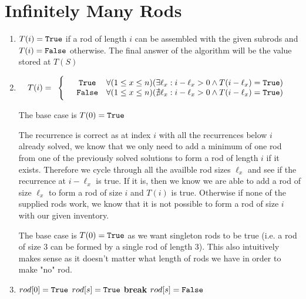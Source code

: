 \documentclass{article}
\begin{document}
\section{Infinitely Many Rods}
\begin{enumerate}
    \item $T(i) = \texttt{True}$ if a rod of length $i$ can be assembled with the given subrods and $T(i) = \texttt{False}$ otherwise.
            The final answer of the algorithm will be the value stored at $T(S)$
    \item         
        \begin{align*}
            T(i) = 
            \begin{array}{cc}
                \Bigg\{ & 
                \begin{array}{cc}
                    \texttt{True} & \forall (1 \leq x \leq n)(\exists \ell_x: i-\ell_x > 0 \land T(i-\ell_x) = \texttt{True})   \\
                    \texttt{False} & \forall (1 \leq x \leq n)(\nexists \ell_x: i-\ell_x > 0 \land T(i-\ell_x) = \texttt{True})
                \end{array}
            \end{array}
        \end{align*}

        The base case is $T(0) = \texttt{True}$

        The recurrence is correct as at index $i$ with all the recurrences below $i$ already solved, we know that we only need to add a minimum of one rod from one of the previously solved solutions to form a rod of length $i$ if it exists.
        Therefore we cycle through all the availble rod sizes $\ell_x$ and see if the recurrence at $i - \ell_x$ is true. If it is, then we know we are able to add a rod of size $\ell_x$ to form a rod of size $i$ and $T(i)$ is true.
        Otherwise if none of the supplied rods work, we know that it is not possible to form a rod of size $i$ with our given inventory. 

        The base case is $T(0) = \texttt{True}$ as we want singleton rods to be true (i.e. a rod of size 3 can be formed by a single rod of length 3). 
        This also intuitively makes sense as it doesn't matter what length of rods we have in order to make "no" rod.

    \item 
        \begin{algorithmic}
                \State $rod[0] = \texttt{True}$
                            \State $rod[s] = \texttt{True}$
                            \State \textbf{break}
                        \Else
                            \State $rod[s] = \texttt{False}$
                        \EndIf
                    \EndFor
                \EndFor


\end{algorithmic}
\end{enumerate}
\end{document}
